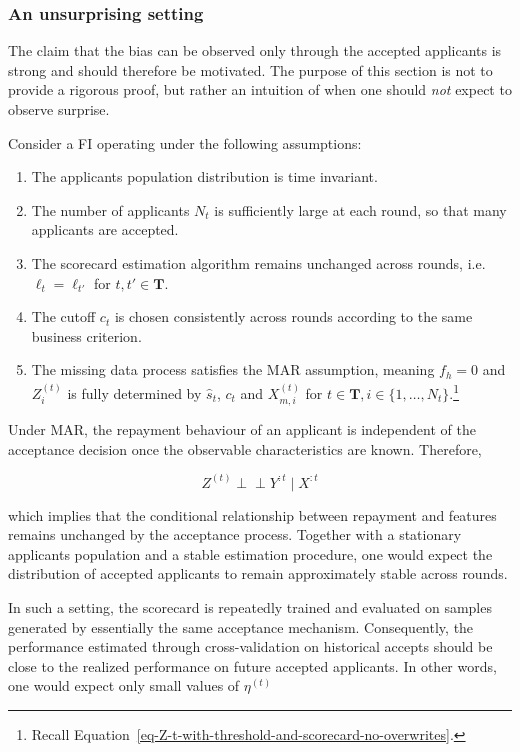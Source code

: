 \documentclass[
  12pt,
]{article}
\providecommand{\tightlist}{%
  \setlength{\itemsep}{0pt}\setlength{\parskip}{0pt}}
\begin{document}
\subsubsection{An unsurprising
setting}\label{sec-an-unsurprising-setting}

The claim that the bias can be observed only through the accepted
applicants is strong and should therefore be motivated. The purpose of
this section is not to provide a rigorous proof, but rather an intuition
of when one should \emph{not} expect to observe surprise.

Consider a FI operating under the following assumptions:

\begin{enumerate}
\def\labelenumi{\arabic{enumi}.}
\tightlist
\item
  The applicants population distribution is time invariant.
\item
  The number of applicants \(N_t\) is sufficiently large at each round,
  so that many applicants are accepted.
\item
  The scorecard estimation algorithm remains unchanged across rounds,
  i.e.~\(\ell_t = \ell_{t'}\) for \(t, t' \in \mathbf{T}\).
\item
  The cutoff \(c_t\) is chosen consistently across rounds according to
  the same business criterion.
\item
  The missing data process satisfies the MAR assumption, meaning
  \(f_h = 0\) and \(Z^{(t)}_i\) is fully determined by \(\hat{s}_t\),
  \(c_t\) and \(X^{(t)}_{m,i}\) for
  \(t \in \mathbf{T}, i \in \{1, \ldots, N_t\}\).\footnote{ Recall
    Equation~\ref{eq-Z-t-with-threshold-and-scorecard-no-overwrites}.}
\end{enumerate}

Under MAR, the repayment behaviour of an applicant is independent of the
acceptance decision once the observable characteristics are known.
Therefore,

\[
Z^{(t)} \perp\!\!\!\perp Y^{:t} \mid X^{:t}
\]

which implies that the conditional relationship between repayment and
features remains unchanged by the acceptance process. Together with a
stationary applicants population and a stable estimation procedure, one
would expect the distribution of accepted applicants to remain
approximately stable across rounds.

In such a setting, the scorecard is repeatedly trained and evaluated on
samples generated by essentially the same acceptance mechanism.
Consequently, the performance estimated through cross-validation on
historical accepts should be close to the realized performance on future
accepted applicants. In other words, one would expect only small values
of \(\eta^{(t)}\)
\end{document}
